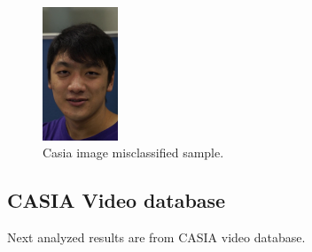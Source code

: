 \begin{figure}[htb]
\centering
\includegraphics[width=0.2\textwidth]{images_databases/casia_real_41.jpg}
\caption{Casia image misclassified sample.} \label{fig:casia_im_miscl}
\end{figure}

\subsection{CASIA Video database}
Next analyzed results are from CASIA video database.\\

